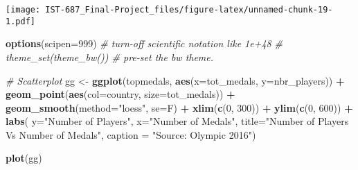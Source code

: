 \documentclass[]{article}
\newenvironment{Shaded}{\begin{snugshade}}{\end{snugshade}}
\newcommand{\CommentTok}[1]{\textcolor[rgb]{0.56,0.35,0.01}{\textit{#1}}}
\newcommand{\DataTypeTok}[1]{\textcolor[rgb]{0.13,0.29,0.53}{#1}}
\newcommand{\DecValTok}[1]{\textcolor[rgb]{0.00,0.00,0.81}{#1}}
\newcommand{\KeywordTok}[1]{\textcolor[rgb]{0.13,0.29,0.53}{\textbf{#1}}}
\newcommand{\NormalTok}[1]{#1}
\newcommand{\OperatorTok}[1]{\textcolor[rgb]{0.81,0.36,0.00}{\textbf{#1}}}
\newcommand{\OtherTok}[1]{\textcolor[rgb]{0.56,0.35,0.01}{#1}}
\newcommand{\StringTok}[1]{\textcolor[rgb]{0.31,0.60,0.02}{#1}}
\begin{document}
\begin{Shaded}
\end{Shaded}

\texttt{[image: IST-687\_Final-Project\_files/figure-latex/unnamed-chunk-19-1.pdf]}

\begin{Shaded}
\begin{Highlighting}[]
\KeywordTok{options}\NormalTok{(}\DataTypeTok{scipen=}\DecValTok{999}\NormalTok{)  }\CommentTok{# turn-off scientific notation like 1e+48}
\CommentTok{# theme_set(theme_bw())  # pre-set the bw theme.}


\CommentTok{# Scatterplot}
\NormalTok{gg <-}\StringTok{ }\KeywordTok{ggplot}\NormalTok{(topmedals, }\KeywordTok{aes}\NormalTok{(}\DataTypeTok{x=}\NormalTok{tot_medals, }\DataTypeTok{y=}\NormalTok{nbr_players)) }\OperatorTok{+}\StringTok{ }
\StringTok{  }\KeywordTok{geom_point}\NormalTok{(}\KeywordTok{aes}\NormalTok{(}\DataTypeTok{col=}\NormalTok{country, }\DataTypeTok{size=}\NormalTok{tot_medals)) }\OperatorTok{+}\StringTok{ }
\StringTok{  }\KeywordTok{geom_smooth}\NormalTok{(}\DataTypeTok{method=}\StringTok{"loess"}\NormalTok{, }\DataTypeTok{se=}\NormalTok{F) }\OperatorTok{+}\StringTok{ }
\StringTok{  }\KeywordTok{xlim}\NormalTok{(}\KeywordTok{c}\NormalTok{(}\DecValTok{0}\NormalTok{, }\DecValTok{300}\NormalTok{)) }\OperatorTok{+}\StringTok{ }
\StringTok{  }\KeywordTok{ylim}\NormalTok{(}\KeywordTok{c}\NormalTok{(}\DecValTok{0}\NormalTok{, }\DecValTok{600}\NormalTok{)) }\OperatorTok{+}\StringTok{ }
\StringTok{  }\KeywordTok{labs}\NormalTok{( }\DataTypeTok{y=}\StringTok{"Number of Players"}\NormalTok{, }
       \DataTypeTok{x=}\StringTok{"Number of Medals"}\NormalTok{, }
       \DataTypeTok{title=}\StringTok{"Number of Players Vs Number of Medals"}\NormalTok{, }
       \DataTypeTok{caption =} \StringTok{"Source: Olympic 2016"}\NormalTok{)}

\KeywordTok{plot}\NormalTok{(gg)}
\end{Highlighting}
\end{Shaded}
\end{document}
